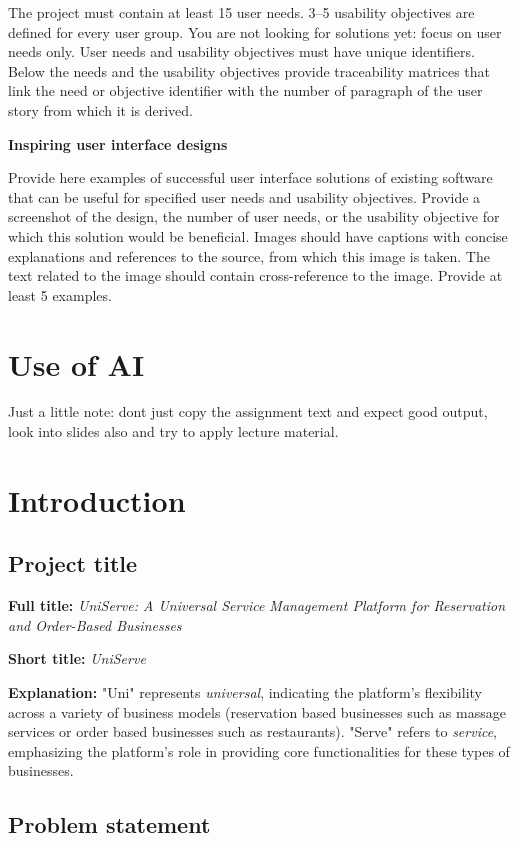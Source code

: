 \documentclass[]{VUMIFTemplateClass}
\begin{document}
The project must contain at least 15 user needs. 3–5 usability objectives are defined for every user group. You are not looking for solutions yet: focus on user needs only. User needs and usability objectives must have unique identifiers. Below the needs and the usability objectives provide traceability matrices that link the need or objective identifier with the number of paragraph of the user story from which it is derived.

\textbf{Inspiring user interface designs}

Provide here examples of successful user interface solutions of existing software that can be useful for specified user needs and usability objectives. Provide a screenshot of the design, the number of user needs, or the usability objective for which this solution would be beneficial. Images should have captions with concise explanations and references to the source, from which this image is taken. The text related to the image should contain cross-reference to the image. Provide at least 5 examples.

\section*{Use of AI}

Just a little note: dont just copy the assignment text and expect good output,
look into slides also and try to apply lecture material. 


\section{Introduction}
\subsection{Project title}

\textbf{Full title:} \textit{UniServe: A Universal Service Management Platform for Reservation and Order-Based Businesses}

\textbf{Short title:} \textit{UniServe}


\textbf{Explanation:} "Uni" represents \emph{universal}, indicating the platform's flexibility across a variety of business models 
(reservation based businesses such as massage services or order based businesses such as restaurants). 
"Serve" refers to \emph{service}, emphasizing the platform’s role in providing core functionalities for these types of businesses.

\subsection{Problem statement}
\end{document}
